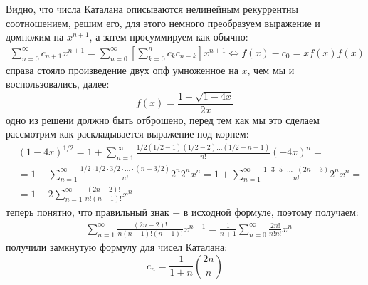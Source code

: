 Видно, что числа Каталана описываются нелинейным рекуррентны соотношением, решим его, для этого немного преобразуем выражение и домножим на $x^{n+1}$, а затем просуммируем как обычно:
\[
	\begin{split}
		\sum_{n=0}^{\infty} c_{n+1}x^{n+1} = \sum_{n=0}^{\infty} \left[\sum_{k=0}^n c_kc_{n-k}\right]x^{n+1} \Leftrightarrow f\left(x\right) - c_0 = xf\left(x\right)f\left(x\right)
	\end{split}
\]
справа стояло произведение двух опф умноженное на $x$, чем мы и воспользовались, далее:
\[
	f\left(x\right) = \frac{1\pm\sqrt{1-4x}}{2x}
\]
одно из решени должно быть отброшено, перед тем как мы это сделаем рассмотрим как раскладывается выражение под корнем:
\[
	\begin{split}
		& \left(1-4x\right)^{1/2} = 1 + \sum_{n=1}^{\infty} \frac{1/2\left(1/2-1\right)\left(1/2-2\right)...\left(1/2-n+1\right)}{n!} \left(-4x\right)^n = \\
		& = 1 - \sum_{n=1}^{\infty}\frac{1/2\cdot1/2\cdot3/2\cdot...\cdot\left(n-3/2\right)}{n!} 2^n2^nx^n = 1+\sum_{n=1}^\infty \frac{1\cdot3\cdot5\cdot...\cdot\left(2n-3\right)}{n!}2^nx^n = \\
		& = 1 - 2\sum_{n=1}^{\infty}\frac{\left(2n-2\right)!}{n!\left(n-1\right)!}x^n
	\end{split}
\]
теперь понятно, что правильный знак $-$ в исходной формуле, поэтому получаем:
\[
	\begin{split}
		& \sum_{n=1}^{\infty} \frac{\left(2n-2\right)!}{n\left(n-1\right)!\left(n-1\right)!} x^{n-1}  = \frac{1}{n+1}\sum_{n=0}^{\infty}\frac{2n!}{n!n!}x^n 
	\end{split}
\]
получили замкнутую формулу для чисел Каталана:
\begin{equation}
	c_n = \frac{1}{1+n}\binom{2n}{n}
\end{equation}
